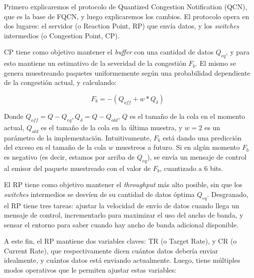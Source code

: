 \documentclass[runningheads,a4paper]{llncs}
\begin{document}
Primero explicaremos el protocolo de Quantized Congestion Notification (QCN), que es la base de FQCN, y luego explicaremos los cambios. El protocolo opera en dos lugares: el servidor (o Reaction Point, RP) que envía datos, y los \textit{switches} intermedios (o Congestion Point, CP).

CP tiene como objetivo mantener el \textit{buffer} con una cantidad de datos $Q_{eq}$, y para esto mantiene un estimativo de la severidad de la congestión $F_b$. El mismo se genera muestreando paquetes uniformemente según una probabilidad dependiente de la congestión actual, y calculando:

$$F_b = -(Q_{off} + w * Q_{\delta})$$

Donde $Q_{off} = Q - Q_{eq}, Q_{\delta} = Q - Q_{old}$, $Q$ es el tamaño de la cola en el momento actual, $Q_{old}$ es el tamaño de la cola en la última muestra, y $w = 2$ es un parámetro de la implementación. Intuitivamente, $F_b$ está dando una predicción del exceso en el tamaño de la cola $w$ muestreos a futuro. Si en algún momento $F_b$ es negativo (es decir, estamos por arriba de $Q_{eq}$), se envía un mensaje de control al emisor del paquete muestreado con el valor de $F_b$, cuantizado a 6 bits.

El RP tiene como objetivo mantener el \textit{throughput} más alto posible, sin que los \textit{switches} intermedios se desvíen de su cantidad de datos óptima $Q_{eq}$. Desgranado, el RP tiene tres tareas: ajustar la velocidad de envío de datos cuando llega un mensaje de control, incrementarlo para maximizar el uso del ancho de banda, y sensar el entorno para saber cuando hay ancho de banda adicional disponible.

A este fin, el RP mantiene dos variables claves: TR (o Target Rate), y CR (o Current Rate), que respectivamente dicen cuántos datos debería enviar idealmente, y cuántos datos está enviando actualmente. Luego, tiene múltiples modos operativos que le permiten ajustar estas variables:
\end{document}
